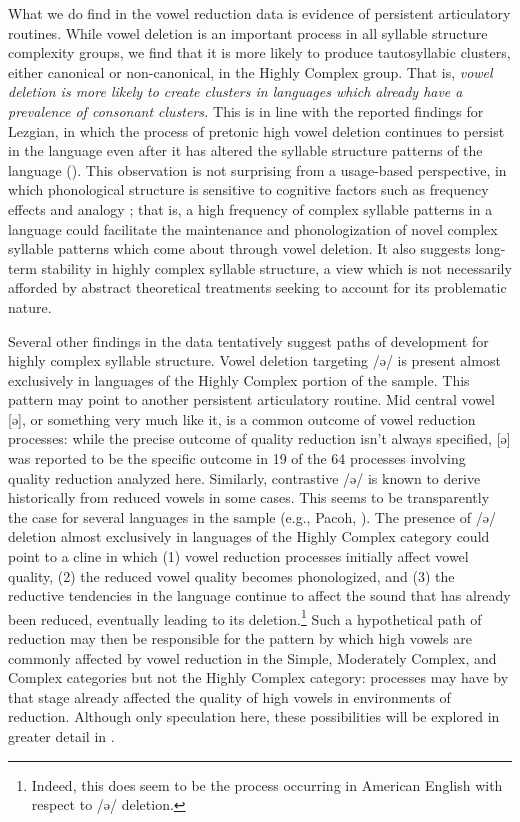   What we do find in the vowel reduction data is evidence of persistent articulatory routines. While vowel deletion is an important process in all syllable structure complexity groups, we find that it is more likely to produce tautosyllabic clusters, either canonical or non-canonical, in the Highly Complex group. That is, \textit{vowel deletion is more likely to create clusters in languages which already have a prevalence of consonant clusters.} This is in line with the reported findings for Lezgian, in which the process of pretonic high vowel deletion continues to persist in the language even after it has altered the syllable structure patterns of the language (\citealt{ChitoranBabaliyeva2007}). This observation is not surprising from a usage-based perspective, in which phonological structure is sensitive to cognitive factors such as frequency effects and analogy \citep{Bybee2001}; that is, a high frequency of complex syllable patterns in a language could facilitate the maintenance and phonologization of novel complex syllable patterns which come about through vowel deletion. It also suggests long-term stability in highly complex syllable structure, a view which is not necessarily afforded by abstract theoretical treatments seeking to account for its problematic nature.

  Several other findings in the data tentatively suggest paths of development for highly complex syllable structure. Vowel deletion targeting /ə/ is present almost exclusively in languages of the Highly Complex portion of the sample. This pattern may point to another persistent articulatory routine. Mid central vowel [ə], or something very much like it, is a common outcome of vowel reduction processes: while the precise outcome of quality reduction isn’t always specified, [ə] was reported to be the specific outcome in 19 of the 64 processes involving quality reduction analyzed here. Similarly, contrastive /ə/ is known to derive historically from reduced vowels in some cases. This seems to be transparently the case for several languages in the sample (e.g., Pacoh, \citealt{Alves2000}). The presence of /ə/ deletion almost exclusively in languages of the Highly Complex category could point to a cline in which 
  (1) vowel reduction processes initially affect vowel quality, 
  (2) the reduced vowel quality becomes phonologized, and 
  (3) the reductive tendencies in the language continue to affect the sound that has already been reduced, eventually leading to its deletion.\footnote{{Indeed, this does seem to be the process occurring in American English with respect to /ə/ deletion.}} Such a hypothetical path of reduction may then be responsible for the pattern by which high vowels are commonly affected by vowel reduction in the Simple, Moderately Complex, and Complex categories but not the Highly Complex category: processes may have by that stage already affected the quality of high vowels in environments of reduction. Although only speculation here, these possibilities will be explored in greater detail in .

